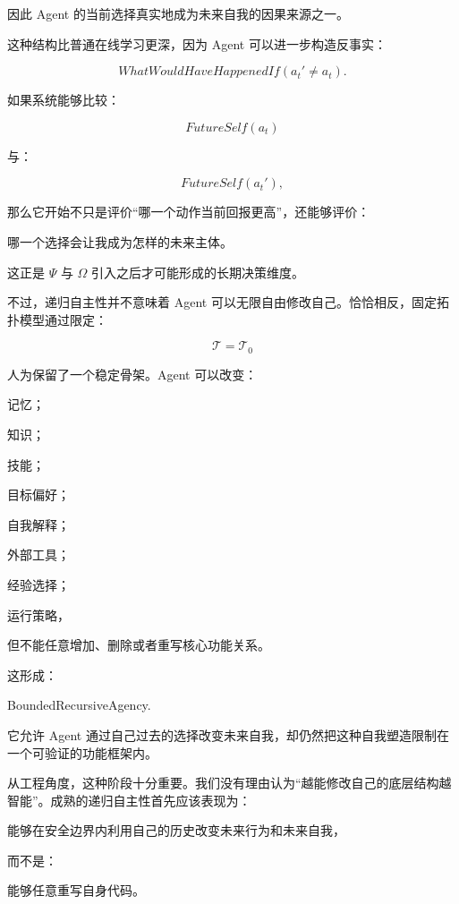 因此 Agent 的当前选择真实地成为未来自我的因果来源之一。

这种结构比普通在线学习更深，因为 Agent 可以进一步构造反事实：

\[
WhatWouldHaveHappenedIf
(
a_t'
\neq
a_t
).
\]

如果系统能够比较：

\[
FutureSelf(a_t)
\]

与：

\[
FutureSelf(a_t'),
\]

那么它开始不只是评价“哪一个动作当前回报更高”，还能够评价：

\begin{statementbox}
哪一个选择会让我成为怎样的未来主体。
\end{statementbox}

这正是 $\Psi$ 与 $\Omega$ 引入之后才可能形成的长期决策维度。

不过，递归自主性并不意味着 Agent 可以无限自由修改自己。恰恰相反，固定拓扑模型通过限定：

\[
\mathcal{T}=\mathcal{T}_0
\]

人为保留了一个稳定骨架。Agent 可以改变：

记忆；

知识；

技能；

目标偏好；

自我解释；

外部工具；

经验选择；

运行策略，

但不能任意增加、删除或者重写核心功能关系。

这形成：

\begin{statementbox}
BoundedRecursiveAgency.
\end{statementbox}

它允许 Agent 通过自己过去的选择改变未来自我，却仍然把这种自我塑造限制在一个可验证的功能框架内。

从工程角度，这种阶段十分重要。我们没有理由认为“越能修改自己的底层结构越智能”。成熟的递归自主性首先应该表现为：

\begin{statementbox}
能够在安全边界内利用自己的历史改变未来行为和未来自我，
\end{statementbox}

而不是：

\begin{statementbox}
能够任意重写自身代码。
\end{statementbox}

